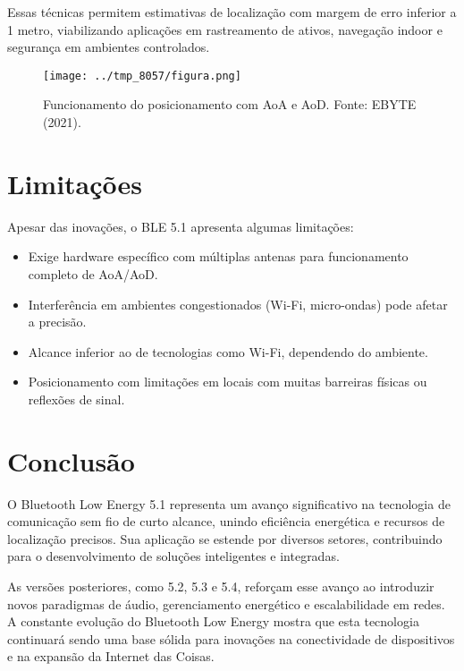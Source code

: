 \documentclass[12pt,a4paper]{report}
\begin{document}
Essas técnicas permitem estimativas de localização com margem de erro inferior a 1 metro, viabilizando aplicações em rastreamento de ativos, navegação indoor e segurança em ambientes controlados.

\begin{figure}[h!]
    \centering
   \texttt{[image: ../tmp\_8057/figura.png]}
    \caption{Funcionamento do posicionamento com AoA e AoD. Fonte: EBYTE (2021).}
    \label{fig:aoa_aod}
\end{figure}

\chapter{Limitações}
Apesar das inovações, o BLE 5.1 apresenta algumas limitações:
\begin{itemize}
    \item Exige hardware específico com múltiplas antenas para funcionamento completo de AoA/AoD.
    \item Interferência em ambientes congestionados (Wi-Fi, micro-ondas) pode afetar a precisão.
    \item Alcance inferior ao de tecnologias como Wi-Fi, dependendo do ambiente.
    \item Posicionamento com limitações em locais com muitas barreiras físicas ou reflexões de sinal.
\end{itemize}

\chapter{Conclusão}
O Bluetooth Low Energy 5.1 representa um avanço significativo na tecnologia de comunicação sem fio de curto alcance, unindo eficiência energética e recursos de localização precisos. Sua aplicação se estende por diversos setores, contribuindo para o desenvolvimento de soluções inteligentes e integradas.

As versões posteriores, como 5.2, 5.3 e 5.4, reforçam esse avanço ao introduzir novos paradigmas de áudio, gerenciamento energético e escalabilidade em redes. A constante evolução do Bluetooth Low Energy mostra que esta tecnologia continuará sendo uma base sólida para inovações na conectividade de dispositivos e na expansão da Internet das Coisas.
\end{document}
